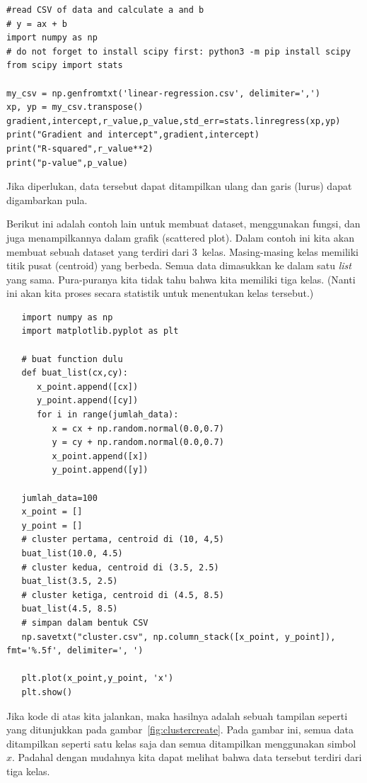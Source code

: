 \begin{verbatim}
#read CSV of data and calculate a and b
# y = ax + b
import numpy as np
# do not forget to install scipy first: python3 -m pip install scipy
from scipy import stats

my_csv = np.genfromtxt('linear-regression.csv', delimiter=',')
xp, yp = my_csv.transpose()
gradient,intercept,r_value,p_value,std_err=stats.linregress(xp,yp)
print("Gradient and intercept",gradient,intercept)
print("R-squared",r_value**2)
print("p-value",p_value)
\end{verbatim}

Jika diperlukan, data tersebut dapat ditampilkan ulang dan garis (lurus)
dapat digambarkan pula.


Berikut ini adalah contoh lain untuk membuat dataset, menggunakan fungsi,
dan juga menampilkannya dalam grafik (scattered plot).
Dalam contoh ini kita akan membuat sebuah dataset yang terdiri dari 3~kelas.
Masing-masing kelas memiliki titik pusat (centroid) yang berbeda.
Semua data dimasukkan ke dalam satu {\em list} yang sama.
Pura-puranya kita tidak tahu bahwa kita memiliki tiga kelas.
(Nanti ini akan kita proses secara statistik untuk menentukan kelas tersebut.)

\begin{verbatim}
   import numpy as np
   import matplotlib.pyplot as plt
   
   # buat function dulu
   def buat_list(cx,cy):
      x_point.append([cx])
      y_point.append([cy])
      for i in range(jumlah_data):
         x = cx + np.random.normal(0.0,0.7)
         y = cy + np.random.normal(0.0,0.7)
         x_point.append([x])
         y_point.append([y])
   
   jumlah_data=100
   x_point = []
   y_point = []
   # cluster pertama, centroid di (10, 4,5)
   buat_list(10.0, 4.5)
   # cluster kedua, centroid di (3.5, 2.5)
   buat_list(3.5, 2.5)
   # cluster ketiga, centroid di (4.5, 8.5)
   buat_list(4.5, 8.5)
   # simpan dalam bentuk CSV
   np.savetxt("cluster.csv", np.column_stack([x_point, y_point]), fmt='%.5f', delimiter=', ')
   
   plt.plot(x_point,y_point, 'x')
   plt.show()
\end{verbatim}

Jika kode di atas kita jalankan, maka hasilnya adalah sebuah tampilan
seperti yang ditunjukkan pada gambar~\ref{fig:clustercreate}.
Pada gambar ini, semua data ditampilkan seperti satu kelas saja dan
semua ditampilkan menggunakan simbol $x$. Padahal dengan mudahnya kita
dapat melihat bahwa data tersebut terdiri dari tiga kelas.

